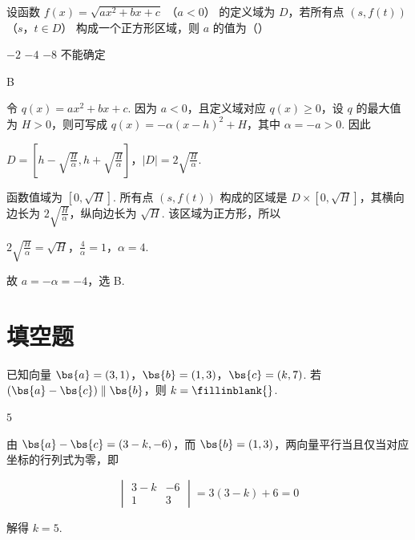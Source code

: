 \begin{problem}
设函数 \( f(x) = \sqrt{ax^2 + bx + c}\) （\(a < 0\)） 的定义域为 \(D\)，若所有点 \( (s, f(t))\) （\(s\)，\(t \in D\)） 构成一个正方形区域，则 \( a \) 的值为（\quad）

\choices
    {\(-2\)}
    {\(-4\)}
    {\(-8\)}
    {不能确定}
\end{problem}

\begin{answer}
B
\end{answer}

\begin{solution}
令 \(q(x)=ax^2+bx+c\). 因为 \(a<0\)，且定义域对应 \(q(x)\geqslant0\)，设 \(q\) 的最大值为 \(H>0\)，则可写成 \(q(x)=-\alpha(x-h)^2+H\)，其中 \(\alpha=-a>0\). 因此

\(D=\left[h-\sqrt{\frac H\alpha},h+\sqrt{\frac H\alpha}\right]\)，\(|D|=2\sqrt{\frac H\alpha}\).

函数值域为 \([0,\sqrt H]\). 所有点 \( (s,f(t)) \) 构成的区域是 \(D\times[0,\sqrt H]\)，其横向边长为 \(2\sqrt{\frac{H}{\alpha}}\)，纵向边长为 \(\sqrt H\). 该区域为正方形，所以

\(2\sqrt{\frac H\alpha}=\sqrt H\)，\(\frac4\alpha=1\)，\(\alpha=4\).

故 \(a=-\alpha=-4\)，选 B.
\end{solution}

\section{填空题}

\begin{problem}
已知向量 \(\bs{a} = (3, 1)\)，\(\bs{b} = (1, 3)\)，\(\bs{c} = (k, 7)\). 若 \((\bs{a} - \bs{c}) \parallel \bs{b}\)，则 \(k =\fillinblank{}\).
\end{problem}

\begin{answer}
\(5\)
\end{answer}

\begin{solution}
由 \(\bs{a}-\bs{c}=(3-k,-6)\)，而 \(\bs{b}=(1,3)\)，两向量平行当且仅当对应坐标的行列式为零，即

\[
\begin{vmatrix}3-k&-6\\1&3\end{vmatrix}=3(3-k)+6=0
\]

解得 \(k=5\).
\end{solution}

